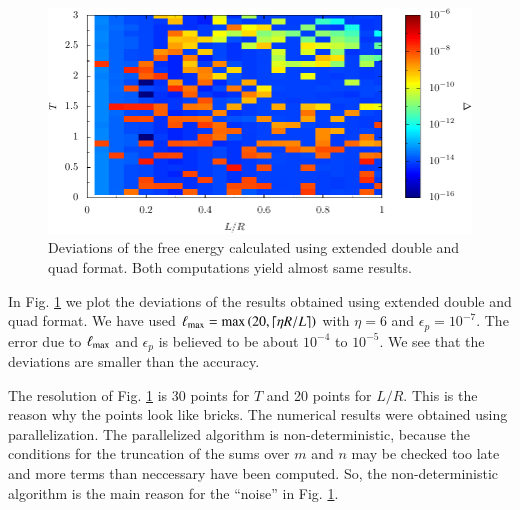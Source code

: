 \begin{figure}
    \includegraphics[scale=1]{plots/numeric/stability/stability.pdf}

    \caption{Deviations of the free energy calculated using extended double and quad format. Both
    computations yield almost same results.}
    \label{fig:numerics_stability}
\end{figure}

In Fig. \ref{fig:numerics_stability} we plot the deviations of the results
obtained using extended double and quad format. We have used
${\ell_\text{max}}=\text{max}\left(20, \lceil\eta R/L\rceil\right)$ with $\eta=6$ and
$\epsilon_p = 10^{-7}$. The error due to ${\ell_\text{max}}$ and $\epsilon_p$ is believed
to be about $10^{-4}$ to $10^{-5}$. We see that the deviations are smaller than
the accuracy.

The resolution of Fig. \ref{fig:numerics_stability} is 30 points for $T$ and 20
points for $L/R$. This is the reason why the points look like bricks. The
numerical results were obtained using parallelization. The parallelized
algorithm is non-deterministic, because the conditions for the truncation of
the sums over $m$ and $n$ may be checked too late and more terms than
neccessary have been computed. So, the non-deterministic algorithm is the main
reason for the ``noise'' in Fig. \ref{fig:numerics_stability}.


%
